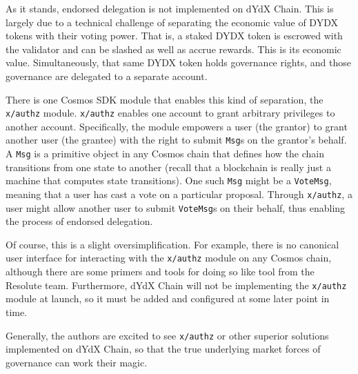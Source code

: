             As it stands, endorsed delegation is not implemented on dYdX Chain. This is largely due to a technical challenge of separating the economic value of DYDX tokens with their voting power. That is, a staked DYDX token is escrowed with the validator and can be slashed as well as accrue rewards. This is its economic value. Simultaneously, that same DYDX token holds governance rights, and those governance are delegated to a separate account.

            There is one Cosmos SDK module that enables this kind of separation, the \texttt{x/authz} module. \texttt{x/authz} enables one account to grant arbitrary privileges to another account. Specifically, the module empowers a user (the grantor) to grant another user (the grantee) with the right to submit \texttt{Msg}s on the grantor's behalf. A \texttt{Msg} is a primitive object in any Cosmos chain that defines how the chain transitions from one state to another (recall that a blockchain is really just a machine that computes state transitions). One such \texttt{Msg} might be a \texttt{VoteMsg}, meaning that a user has cast a vote on a particular proposal. Through \texttt{x/authz}, a user might allow another user to submit \texttt{VoteMsg}s on their behalf, thus enabling the process of endorsed delegation.

            Of course, this is a slight oversimplification. For example, there is no canonical user interface for interacting with the \texttt{x/authz} module on any Cosmos chain, although there are some primers and tools for doing so like  tool from the Resolute team. Furthermore, dYdX Chain will not be implementing the \texttt{x/authz} module at launch, so it must be added and configured at some later point in time.

            Generally, the authors are excited to see \texttt{x/authz} or other superior solutions implemented on dYdX Chain, so that the true underlying market forces of governance can work their magic.